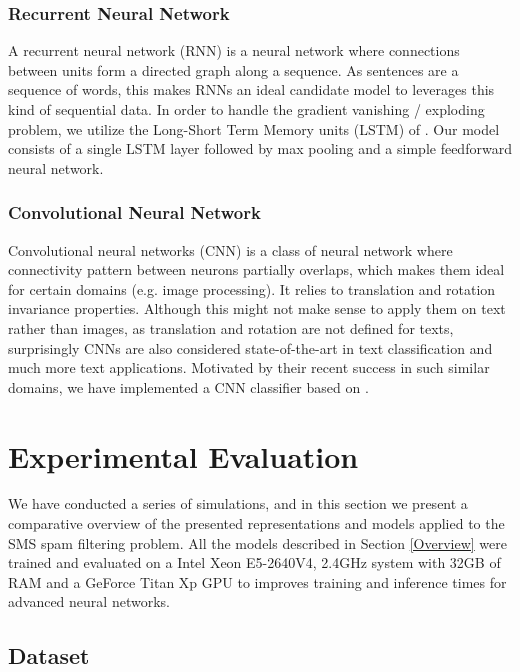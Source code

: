 \documentclass[letterpaper]{article}
\begin{document}
\subsubsection{Recurrent Neural Network} \label{Recurrent Neural Network}

A recurrent neural network (RNN) is a neural network where connections between units form a directed graph along a sequence. As sentences are a sequence of words, this makes RNNs an ideal candidate model to leverages this kind of sequential data. In order to handle the gradient vanishing / exploding problem, we utilize the Long-Short Term Memory units (LSTM) of \cite{hochreiter1997long}. Our model consists of a single LSTM layer followed by max pooling and a simple feedforward neural network.

\subsubsection{Convolutional Neural Network} \label{Convolutional Neural Network}

Convolutional neural networks (CNN) is a class of neural network where connectivity pattern between neurons partially overlaps, which makes them ideal for certain domains (e.g. image processing). It relies to translation and rotation invariance properties. Although this might not make sense to apply them on text rather than images, as translation and rotation are not defined for texts, surprisingly CNNs are also considered state-of-the-art in text classification \cite{CaoLLW17} \cite{kim2014convolutional} \cite{zhang2015understanding} \cite{XiaoC16} and much more text applications. Motivated by their recent success in such similar domains, we have implemented a CNN classifier based on \cite{kim2014convolutional}.

\section{Experimental Evaluation} \label{Experimental Evaluation}

We have conducted a series of simulations, and in this section we present a comparative overview of the presented representations and models applied to the SMS spam filtering problem. All the models described in Section \ref{Overview} were trained and evaluated on a Intel Xeon E5-2640V4, 2.4GHz system with 32GB of RAM and a GeForce Titan Xp GPU to improves training and inference times for advanced neural networks.

\subsection{Dataset}  \label{Dataset}
\end{document}
